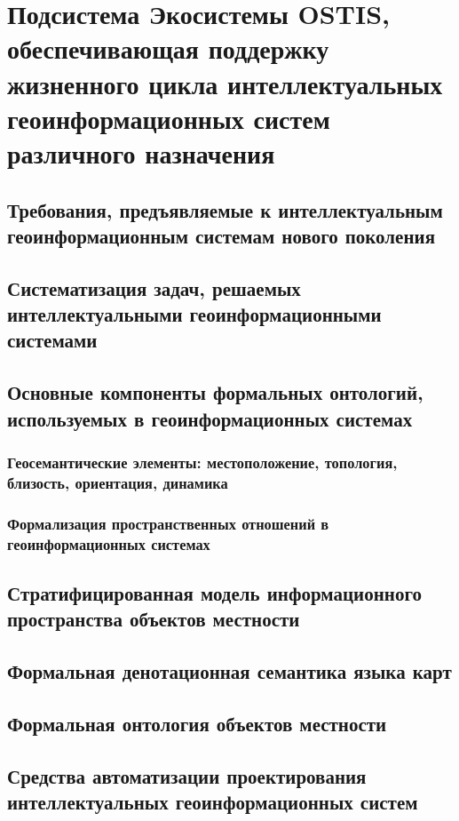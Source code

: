 \chapter{Подсистема Экосистемы OSTIS, обеспечивающая поддержку жизненного цикла интеллектуальных геоинформационных систем различного назначения}
\label{chapter_gis}


\section{Требования, предъявляемые к интеллектуальным геоинформационным системам нового поколения}
\section{Систематизация задач, решаемых интеллектуальными геоинформационными системами}
\section{Основные компоненты формальных онтологий, используемых в геоинформационных системах}
\subsection{Геосемантические элементы: местоположение, топология, близость, ориентация, динамика}
\subsection{Формализация пространственных отношений в геоинформационных системах}
\section{Стратифицированная модель информационного пространства объектов местности}
\section{Формальная денотационная семантика языка карт}
\section{Формальная онтология объектов местности}
\section{Средства автоматизации проектирования интеллектуальных геоинформационных систем}

%